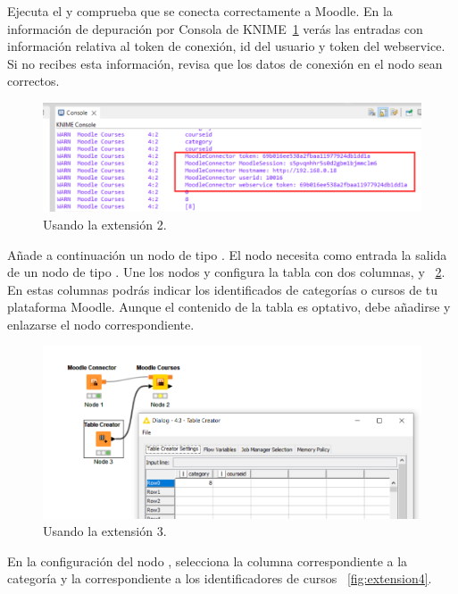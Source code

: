 Ejecuta el  y comprueba que se conecta correctamente a Moodle. En la información de 
depuración por Consola de KNIME~\ref{fig:extension2} verás las entradas  con 
información relativa al token de conexión, id del usuario y token del webservice. 
Si no recibes esta información, revisa que los datos de conexión en el nodo sean correctos. 
\

\begin{figure}[!htb]
	\centering
	\includegraphics[width=1\textwidth]{img/manual_usuario_moodle_connector_login.png}
	\caption{Usando la extensión  2.}
	\label{fig:extension2}
\end{figure}
\FloatBarrier

Añade a continuación un nodo de tipo . El nodo necesita como entrada la salida de un nodo de tipo . 
Une los nodos y configura la tabla con dos columnas,  y  ~\ref{fig:extension3}. En estas columnas podrás indicar 
los identificados de categorías o cursos de tu plataforma Moodle. Aunque el contenido de la tabla 
es optativo, debe añadirse y enlazarse el nodo correspondiente. 

\begin{figure}[!htb]
	\centering
	\includegraphics[width=1\textwidth]{img/manual_usuario_moodle_courses_table.png}
	\caption{Usando la extensión  3.}
	\label{fig:extension3}
\end{figure}
\FloatBarrier


En la configuración del nodo , selecciona la columna 
correspondiente a la categoría y la correspondiente a los identificadores de cursos ~\ref{fig:extension4}. 

